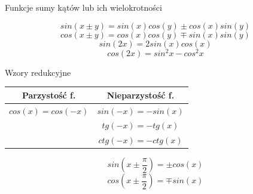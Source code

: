 \documentclass{article}
\newenvironment{kol2}{\noindent \begin{minipage}[t]{0.5\linewidth}}{\end{minipage}}
\begin{document}
\vspace{0.5cm}
\begin{kol2}

    \noindent
    Funkcje sumy kątów lub ich wielokrotności

    $$  sin( x\pm y) = sin(x)cos(y) \pm cos(x)sin(y) $$
    $$  cos( x\pm y) = cos(x)cos(y) \mp sin(x)sin(y) $$
    $$  sin(2x) = 2sin(x)cos(x) $$
    $$  cos(2x) = sin^2x - cos^2x   $$

\end{kol2}
\begin{kol2}

    \noindent
    Wzory redukcyjne

    \centering
    \begin{tabular}{c c}
        Parzystość f.      & Nieparzystość f.     \\ \hline
        $cos(x) = cos(-x)$ & $sin(-x) = - sin(x)$ \\
                           & $tg(-x) = -tg(x)$    \\
                           & $ctg(-x) = - ctg(x)$ \\
    \end{tabular}

    $$  sin( x \pm \frac{\pi}{2} ) = \pm cos( x ) $$
    $$  cos( x \pm \frac{\pi}{2} ) = \mp sin( x ) $$
\end{kol2}
\end{document}
